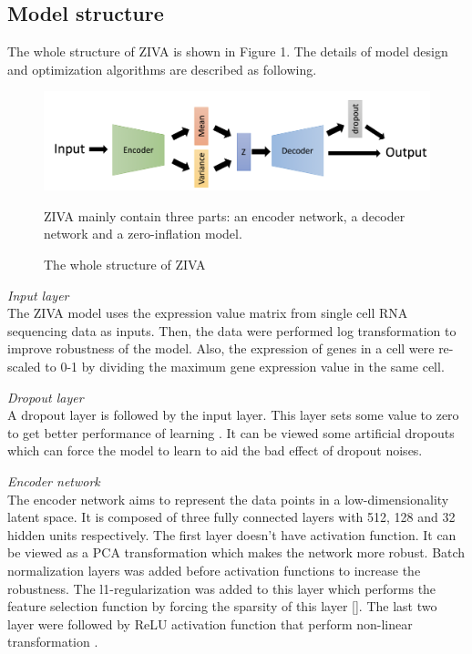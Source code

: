 \subsection{Model structure}
The whole structure of ZIVA is shown in Figure 1. The details of model design and optimization algorithms are described as following. 
\begin{figure}
    \centering
    \includegraphics[width=1\textwidth]{figures/myfigures/ZIVA.png}
    \caption{The whole structure of ZIVA}\label{F:test-a}
    ZIVA mainly contain three parts: an encoder network, a decoder network and a zero-inflation model. 
\end{figure}

\vspace{0.5cm}
\noindent\emph{Input layer} \\ The ZIVA model uses the expression value matrix from single cell RNA sequencing data as inputs. Then, the data were performed log transformation to improve robustness of the model.  Also, the expression of genes in a cell were re-scaled to 0-1 by dividing the maximum gene expression value in the same cell. 

\vspace{0.5cm}
\noindent\emph{Dropout layer} \\ A dropout layer \cite{baldi2013understanding} is followed by the input layer. This layer sets some value to zero to get better performance of learning \cite{vincent2008extracting}. It can be viewed some artificial dropouts which can force the model to learn to aid the bad effect of dropout noises. 

\vspace{0.5cm}
\noindent\emph{Encoder network} \\
The encoder network aims to represent the data points in a low-dimensionality latent space. It is composed of three fully connected layers with 512, 128 and 32 hidden units respectively. The first layer doesn’t have activation function. It can be viewed as a PCA transformation which makes the network more robust. Batch normalization layers was added before activation functions to increase the robustness. The l1-regularization was added to this layer which performs the feature selection function by forcing the sparsity of this layer []. The last two layer were followed by ReLU activation function that perform non-linear transformation \cite{krizhevsky2012imagenet}.

